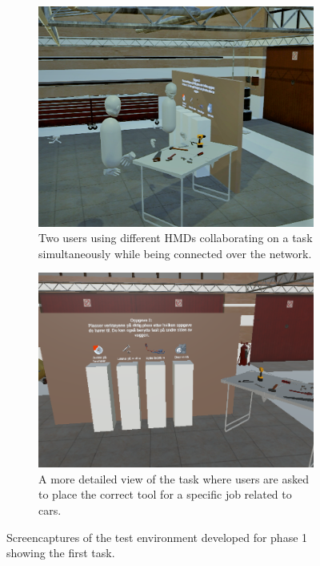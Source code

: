 \begin{figure}[]
  \centering
  \begin{subfigure}[b]{0.445\textwidth}
    \includegraphics[width=1\textwidth]{./fig/phase_1/phase1_capture2.PNG}
    \caption{Two users using different HMDs collaborating on a task simultaneously while being connected over the network.}
    \label{fig:task1WithUsers}
  \end{subfigure}
    \hfill%
  \begin{subfigure}[b]{0.5\textwidth}
    \includegraphics[width=1\textwidth]{fig/phase_1/phase1Task2.PNG}
    \caption{A more detailed view of the task where users are asked to place the correct tool for a specific job related to cars.}
    \label{fig:task1WithDetail}
  \end{subfigure}
  \hfill%
  \caption{Screencaptures of the test environment developed for phase 1 showing the first task.}
  \label{fig:phase1Capture1}
\end{figure}


